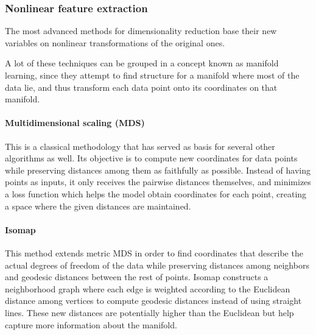 
\subsubsection{Nonlinear feature extraction}

The most advanced methods for dimensionality reduction base their new variables on nonlinear transformations of the original ones.

A lot of these techniques can be grouped in a concept known as manifold learning, since they attempt to find structure for a manifold where most of the data lie, and thus transform each data point onto its coordinates on that manifold.

\paragraph*{Multidimensional scaling (MDS) \cite{borg2005modern}}
This is a classical methodology that has served as basis for several other algorithms as well. Its objective is to compute new coordinates for data points while preserving distances among them as faithfully as possible. Instead of having points as inputs, it only receives the pairwise distances themselves, and minimizes a loss function which helps the model obtain coordinates for each point, creating a space where the given distances are maintained. %


\paragraph*{Isomap \cite{Isomap}} This method extends metric MDS in order to find coordinates that describe the actual degrees of freedom of the data while preserving distances among neighbors and geodesic distances between the rest of points. %
Isomap constructs a neighborhood graph where each edge is weighted according to the Euclidean distance among vertices to compute geodesic distances instead of using straight lines. These new distances are potentially higher than the Euclidean but help capture more information about the manifold.

